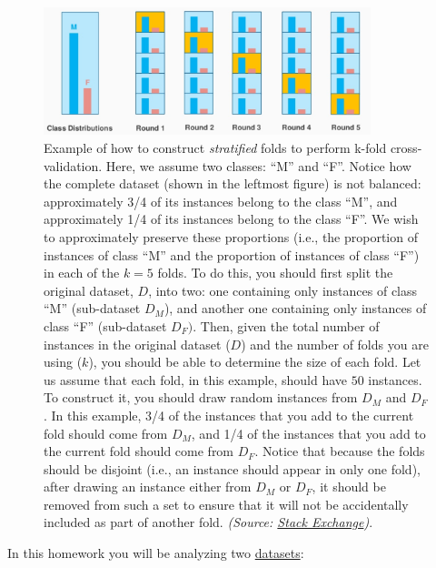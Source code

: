 \documentclass[letterpaper]{article}
\begin{document}
    \begin{figure}[hb!!]
        \centering
        \includegraphics[width=0.85\textwidth]{figures/cross_val_stratified2.png}
        \caption{Example of how to construct \textit{stratified} folds to perform k-fold cross-validation. Here, we assume two classes: ``M'' and ``F''. Notice how the complete dataset (shown in the leftmost figure) is not balanced: approximately 3/4 of its instances belong to the class ``M'', and approximately 1/4 of its instances belong to the class ``F''. We wish to approximately preserve these proportions (i.e., the proportion of instances of class ``M'' and the proportion of instances of class ``F'') in each of the $k=5$ folds. To do this, you should first split the original dataset, $D$, into two: one containing only instances of class ``M'' (sub-dataset $D_M$), and another one containing only instances of class  ``F'' (sub-dataset $D_F)$. Then, given the total number of instances in the original dataset ($D$) and the number of folds you are using ($k$), you should be able to determine the size of each fold. Let us assume that each fold, in this example, should have $50$ instances. To construct it, you should draw random instances from $D_M$ and $D_F$. In this example, 3/4 of the instances that you add to the current fold should come from $D_M$, and 1/4 of the instances that you add to the current fold should come from $D_F$. Notice that because the folds should be disjoint (i.e., an instance should appear in only one fold), after drawing an instance either from $D_M$ or $D_F$, it should be removed from such a set to ensure that it will not be accidentally included as part of another fold. \textit{(Source: \href{https://stats.stackexchange.com/questions/49540/understanding-stratified-cross-validation}{Stack Exchange})}.}
        \label{fig:cross-val}
    \end{figure}

\clearpage
In this homework you will be analyzing two \href{https://people.cs.umass.edu/~bsilva/courses/CMPSCI_589/Spring2024/homeworks/hw3.zip}{datasets}:
\end{document}

